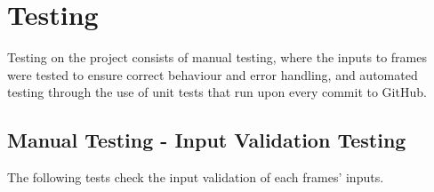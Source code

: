 \documentclass[./project-report/src/latex/project-report.tex]{subfiles}
\begin{document}
\maketitle

\clearpage
\section{Testing}

Testing on the project consists of manual testing, where the inputs to frames were tested to ensure correct behaviour and error handling, and automated testing through the 
use of unit tests that run upon every commit to GitHub.

\subsection{Manual Testing - Input Validation Testing}

The following tests check the input validation of each frames' inputs.
\end{document}
